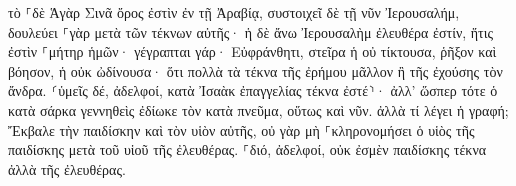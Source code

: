 \documentclass{openreader}
\begin{document}
τὸ ⸀δὲ Ἁγὰρ Σινᾶ ὄρος ἐστὶν ἐν τῇ Ἀραβίᾳ, συστοιχεῖ δὲ τῇ νῦν Ἰερουσαλήμ, δουλεύει ⸀γὰρ μετὰ τῶν τέκνων αὐτῆς· 
ἡ δὲ ἄνω Ἰερουσαλὴμ ἐλευθέρα ἐστίν, ἥτις ἐστὶν ⸀μήτηρ ἡμῶν· 
γέγραπται γάρ· Εὐφράνθητι, στεῖρα ἡ οὐ τίκτουσα, ῥῆξον καὶ βόησον, ἡ οὐκ ὠδίνουσα· ὅτι πολλὰ τὰ τέκνα τῆς ἐρήμου μᾶλλον ἢ τῆς ἐχούσης τὸν ἄνδρα. 
⸂ὑμεῖς δέ, ἀδελφοί, κατὰ Ἰσαὰκ ἐπαγγελίας τέκνα ἐστέ⸃· 
ἀλλ’ ὥσπερ τότε ὁ κατὰ σάρκα γεννηθεὶς ἐδίωκε τὸν κατὰ πνεῦμα, οὕτως καὶ νῦν. 
ἀλλὰ τί λέγει ἡ γραφή; Ἔκβαλε τὴν παιδίσκην καὶ τὸν υἱὸν αὐτῆς, οὐ γὰρ μὴ ⸀κληρονομήσει ὁ υἱὸς τῆς παιδίσκης μετὰ τοῦ υἱοῦ τῆς ἐλευθέρας. 
⸀διό, ἀδελφοί, οὐκ ἐσμὲν παιδίσκης τέκνα ἀλλὰ τῆς ἐλευθέρας. 
\end{document}
